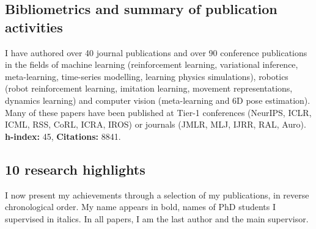 \subsection{Bibliometrics and summary of publication activities}
I have authored over 40 journal publications and over 90 conference publications in the fields of machine learning (reinforcement learning, variational inference, meta-learning, time-series modelling, learning physics simulations), robotics (robot reinforcement learning, imitation learning, movement representations, dynamics learning) and computer vision (meta-learning and 6D pose estimation). Many of these papers have been published at Tier-1 conferences (NeurIPS, ICLR, ICML, RSS, CoRL, ICRA, IROS) or journals (JMLR, MLJ, IJRR, RAL, Auro). 
\textbf{h-index:} 45, \textbf{Citations:} 8841.

\subsection{10 research highlights}

I now present my achievements through a selection of my publications, in
reverse chronological order. My name appears in bold, names of PhD
students I supervised in italics. In all papers, I am the last author and the main supervisor.

